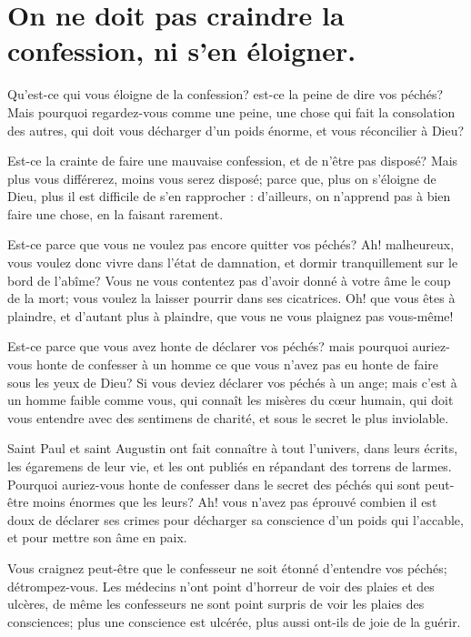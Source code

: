 \documentclass[instructions.tex]{subfiles}
\begin{document}
 
\chapter{On ne doit pas craindre la confession, ni s’en éloigner.}
 
Qu’est-ce qui vous éloigne de la confession? est-ce la peine de dire vos péchés? Mais pourquoi regardez-vous comme une peine, une chose qui fait la consolation des autres, qui doit vous décharger d’un poids énorme, et vous réconcilier à Dieu?
 
Est-ce la crainte de faire une mauvaise confession, et de n’être pas disposé? Mais plus vous différerez, moins vous serez disposé; parce que, plus on s’éloigne de Dieu, plus il est difficile de s’en rapprocher : d’ailleurs, on n’apprend pas à bien faire une chose, en la faisant rarement.
 
Est-ce parce que vous ne voulez pas encore quitter vos péchés? Ah! malheureux, vous voulez donc vivre dans l’état de damnation, et dormir tranquillement sur le bord de l’abîme? Vous ne vous contentez pas d’avoir donné à votre âme le coup de la mort; vous voulez la laisser pourrir dans ses cicatrices. Oh! que vous êtes à plaindre, et d’autant plus à plaindre, que vous ne vous plaignez pas vous-même!
 
Est-ce parce que vous avez honte de déclarer vos péchés? mais pourquoi auriez-vous honte de confesser à un homme ce que vous n’avez pas eu honte de faire sous les yeux de Dieu? Si vous deviez déclarer vos péchés à un ange; mais c’est à un homme faible comme vous, qui connaît les misères du cœur humain, qui doit vous entendre avec des sentimens de charité, et sous le secret le plus inviolable.
 
Saint Paul et saint Augustin ont fait connaître à tout l’univers, dans leurs écrits, les égaremens de leur vie, et les ont publiés en répandant des torrens de larmes. Pourquoi auriez-vous honte de confesser dans le secret des péchés qui sont peut-être moins énormes que les leurs? Ah! vous n’avez pas éprouvé combien il est doux de déclarer ses crimes pour décharger sa conscience d’un poids qui l’accable, et pour mettre son âme en paix.
 
Vous craignez peut-être que le confesseur ne soit étonné d’entendre vos péchés; détrompez-vous. Les médecins n’ont point d’horreur de voir des plaies et des ulcères, de même les confesseurs ne sont point surpris de voir les plaies des consciences; plus une conscience est ulcérée, plus aussi ont-ils de joie de la guérir.
 
\end{document}
